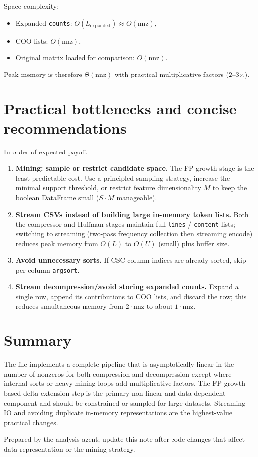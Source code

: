 \documentclass[11pt]{article}
\begin{document}
Space complexity:
\begin{itemize}
	\item Expanded \texttt{counts}: $O(L_{\text{expanded}})\approx O(\mathrm{nnz})$,
	\item COO lists: $O(\mathrm{nnz})$,
	\item Original matrix loaded for comparison: $O(\mathrm{nnz})$.
\end{itemize}
Peak memory is therefore $\Theta(\mathrm{nnz})$ with practical multiplicative factors (2--3$\times$).

\section*{Practical bottlenecks and concise recommendations}
In order of expected payoff:
\begin{enumerate}
	\item \textbf{Mining: sample or restrict candidate space.} The FP-growth stage is the least predictable cost. Use a
		principled sampling strategy, increase the minimal support threshold, or restrict feature dimensionality $M$ to
		keep the boolean DataFrame small ($S\cdot M$ manageable).
	\item \textbf{Stream CSVs instead of building large in-memory token lists.} Both the compressor and Huffman stages
		maintain full \texttt{lines} / \texttt{content} lists; switching to streaming (two-pass frequency collection then streaming encode)
		reduces peak memory from $O(L)$ to $O(U)$ (small) plus buffer size.
	\item \textbf{Avoid unnecessary sorts.} If CSC column indices are already sorted, skip per-column \texttt{argsort}.
	\item \textbf{Stream decompression/avoid storing expanded counts.} Expand a single row, append its contributions to COO lists,
		and discard the row; this reduces simultaneous memory from $2\cdot\mathrm{nnz}$ to about $1\cdot\mathrm{nnz}$.
\end{enumerate}

\section*{Summary}
The file implements a complete pipeline that is asymptotically linear in the number of nonzeros for both compression
and decompression except where internal sorts or heavy mining loops add multiplicative factors. The FP-growth based
delta-extension step is the primary non-linear and data-dependent component and should be constrained or sampled for
large datasets. Streaming IO and avoiding duplicate in-memory representations are the highest-value practical changes.

\vspace{1em}
\noindent{}Prepared by the analysis agent; update this note after code changes that affect data representation or the mining strategy.
\end{document}
